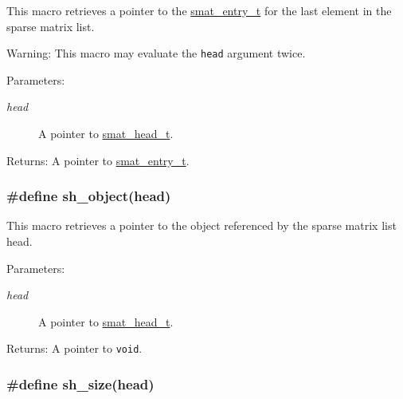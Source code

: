 This macro retrieves a pointer to the \hyperlink{group__dbprim__smat_a2}{smat\_\-entry\_\-t} for the last element in the sparse matrix list.

\begin{Desc}
\item[Warning:]This macro may evaluate the {\tt head} argument twice.\end{Desc}
\begin{Desc}
\item[Parameters:]
\begin{description}
\item[{\em head}]A pointer to \hyperlink{group__dbprim__smat_a1}{smat\_\-head\_\-t}.\end{description}
\end{Desc}
\begin{Desc}
\item[Returns:]A pointer to \hyperlink{group__dbprim__smat_a2}{smat\_\-entry\_\-t}. \end{Desc}
\hypertarget{group__dbprim__smat_a36}{
\subsubsection[sh\_\-object]{\setlength{\rightskip}{0pt plus 5cm}\#define sh\_\-object(head)}}
\label{group__dbprim__smat_a36}


This macro retrieves a pointer to the object referenced by the sparse matrix list head.

\begin{Desc}
\item[Parameters:]
\begin{description}
\item[{\em head}]A pointer to \hyperlink{group__dbprim__smat_a1}{smat\_\-head\_\-t}.\end{description}
\end{Desc}
\begin{Desc}
\item[Returns:]A pointer to {\tt void}. \end{Desc}
\hypertarget{group__dbprim__smat_a37}{
\subsubsection[sh\_\-size]{\setlength{\rightskip}{0pt plus 5cm}\#define sh\_\-size(head)}}
\label{group__dbprim__smat_a37}


